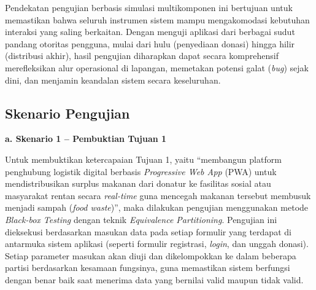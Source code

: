 Pendekatan pengujian berbasis simulasi multikomponen ini bertujuan untuk memastikan bahwa seluruh instrumen sistem mampu mengakomodasi kebutuhan interaksi yang saling berkaitan. Dengan menguji aplikasi dari berbagai sudut pandang otoritas pengguna, mulai dari hulu (penyediaan donasi) hingga hilir (distribusi akhir), hasil pengujian diharapkan dapat secara komprehensif merefleksikan alur operasional di lapangan, memetakan potensi galat (\textit{bug}) sejak dini, dan menjamin keandalan sistem secara keseluruhan.




\subsection{Skenario Pengujian}
\textbf{a. Skenario 1 – Pembuktian Tujuan 1}

Untuk membuktikan ketercapaian Tujuan 1, yaitu “membangun platform penghubung logistik digital berbasis \textit{Progressive Web App} (PWA) untuk mendistribusikan surplus makanan dari donatur ke fasilitas sosial atau masyarakat rentan secara \textit{real-time} guna mencegah makanan tersebut membusuk menjadi sampah (\textit{food waste})”, maka dilakukan pengujian menggunakan metode \textit{Black-box Testing} dengan teknik \textit{Equivalence Partitioning}. Pengujian ini dieksekusi berdasarkan masukan data pada setiap formulir yang terdapat di antarmuka sistem aplikasi (seperti formulir registrasi, \textit{login}, dan unggah donasi). Setiap parameter masukan akan diuji dan dikelompokkan ke dalam beberapa partisi berdasarkan kesamaan fungsinya, guna memastikan sistem berfungsi dengan benar baik saat menerima data yang bernilai valid maupun tidak valid.

